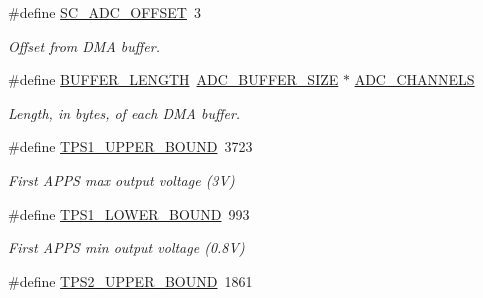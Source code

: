\begin{DoxyCompactItemize}
\#define \mbox{\hyperlink{group___board__model__group_ga58133efa918e1af6c0cc436137c78cc0}{S\+C\+\_\+\+A\+D\+C\+\_\+\+O\+F\+F\+S\+ET}}~3
\begin{DoxyCompactList}\small\item\em Offset from D\+MA buffer. \end{DoxyCompactList}\item 
\mbox{\label{group___board__model__group_gaf7b7dc9a200cb1404c280bd500fd1551}} 
\#define \mbox{\hyperlink{group___board__model__group_gaf7b7dc9a200cb1404c280bd500fd1551}{B\+U\+F\+F\+E\+R\+\_\+\+L\+E\+N\+G\+TH}}~\mbox{\hyperlink{group___board__model__group_ga602abb8ec84dcb3b6f854a738310ea46}{A\+D\+C\+\_\+\+B\+U\+F\+F\+E\+R\+\_\+\+S\+I\+ZE}} $\ast$ \mbox{\hyperlink{group___board__model__group_ga065dcfa648ca52ed6214008cb177de36}{A\+D\+C\+\_\+\+C\+H\+A\+N\+N\+E\+LS}}
\begin{DoxyCompactList}\small\item\em Length, in bytes, of each D\+MA buffer. \end{DoxyCompactList}\item 
\mbox{\label{group___board__model__group_ga6741cba3daf129b6f73eed1b1db09519}} 
\#define \mbox{\hyperlink{group___board__model__group_ga6741cba3daf129b6f73eed1b1db09519}{T\+P\+S1\+\_\+\+U\+P\+P\+E\+R\+\_\+\+B\+O\+U\+ND}}~3723
\begin{DoxyCompactList}\small\item\em First A\+P\+PS max output voltage (3V) \end{DoxyCompactList}\item 
\mbox{\label{group___board__model__group_ga9c9aa914f6b372d9ef3f15ce4108da6a}} 
\#define \mbox{\hyperlink{group___board__model__group_ga9c9aa914f6b372d9ef3f15ce4108da6a}{T\+P\+S1\+\_\+\+L\+O\+W\+E\+R\+\_\+\+B\+O\+U\+ND}}~993
\begin{DoxyCompactList}\small\item\em First A\+P\+PS min output voltage (0.\+8V) \end{DoxyCompactList}\item 
\mbox{\label{group___board__model__group_gac8be8d89c699c40b79d04c0fdf6238f4}} 
\#define \mbox{\hyperlink{group___board__model__group_gac8be8d89c699c40b79d04c0fdf6238f4}{T\+P\+S2\+\_\+\+U\+P\+P\+E\+R\+\_\+\+B\+O\+U\+ND}}~1861

\end{DoxyCompactItemize}
